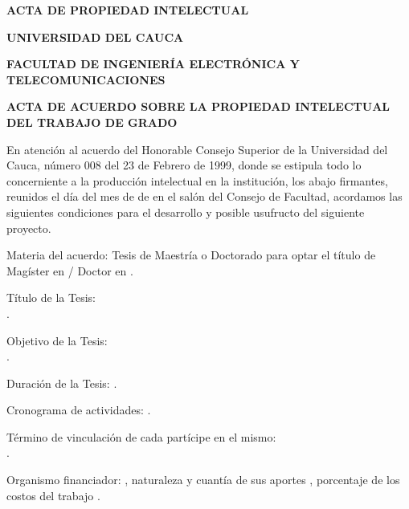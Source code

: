 \centering

\textbf{ACTA DE PROPIEDAD INTELECTUAL}

\textbf{UNIVERSIDAD DEL CAUCA}

\textbf{FACULTAD DE INGENIERÍA ELECTRÓNICA Y TELECOMUNICACIONES}

\textbf{ACTA DE ACUERDO SOBRE LA PROPIEDAD INTELECTUAL DEL TRABAJO DE GRADO}

\justify

En atención al acuerdo del Honorable Consejo Superior de la Universidad del Cauca, número 008 del 23 de Febrero de 1999, donde se estipula todo lo concerniente a la producción intelectual en la institución, los abajo firmantes, reunidos el día \underline{\hspace{4ex}} del mes de \underline{\hspace{12ex}} de \underline{\hspace{8ex}} en el salón del Consejo de Facultad, acordamos las siguientes condiciones para el desarrollo y posible usufructo del siguiente proyecto.


Materia del acuerdo: Tesis de Maestría o Doctorado para optar el título de Magíster en / Doctor en \underline{\hspace{0.99\textwidth}}.

Título de la Tesis: \underline{\hspace{0.82\textwidth}} \\ \underline{\hspace{0.99\textwidth}}.

Objetivo de la Tesis: \underline{\hspace{0.8\textwidth}} \\ \underline{\hspace{0.99\textwidth}}.

Duración de la Tesis: \underline{\hspace{0.4\textwidth}}.

Cronograma de actividades: \underline{\hspace{0.4\textwidth}}.

Término de vinculación de cada partícipe en el mismo: \underline{\hspace{0.46\textwidth}} \\ \underline{\hspace{0.99\textwidth}}.

Organismo financiador: \underline{\hspace{16ex}}, naturaleza y cuantía de sus aportes \underline{\hspace{16ex}}, porcentaje de los costos del trabajo \underline{\hspace{16ex}}.


